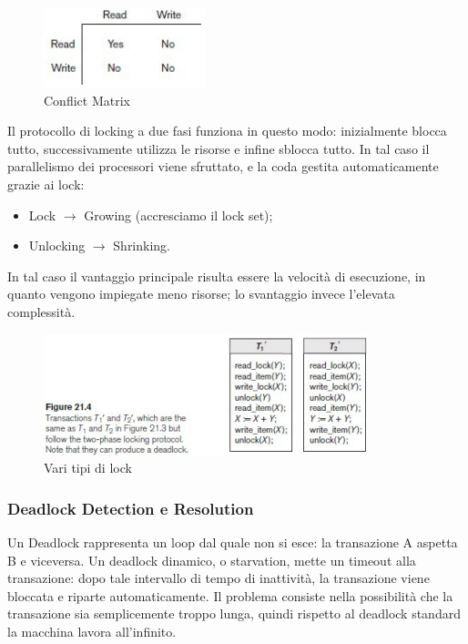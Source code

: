 \begin{center}
\begin{figure}[H]
\centering
\includegraphics[scale=1]{figures/conflict_matrix.png}
\caption{Conflict Matrix}
\end{figure}
\end{center}

Il protocollo di locking a due fasi funziona in questo modo: inizialmente blocca tutto, successivamente utilizza le risorse e infine sblocca tutto. In tal caso il parallelismo dei processori viene sfruttato, e la coda gestita automaticamente grazie ai lock:

\begin{itemize}

\item Lock $\rightarrow$ Growing (accresciamo il lock set);
\item Unlocking $\rightarrow$ Shrinking.

\end{itemize}

In tal caso il vantaggio principale risulta essere la velocità di esecuzione, in quanto vengono impiegate meno risorse; lo svantaggio invece l’elevata complessità.   

\begin{center}
\begin{figure}[H]
\centering
\includegraphics[scale=1]{figures/lock_modes.png}
\caption{Vari tipi di lock}
\end{figure}
\end{center}


\subsubsection{Deadlock Detection e Resolution}

Un Deadlock rappresenta un loop dal quale non si esce: la transazione A aspetta B e viceversa. Un deadlock dinamico, o starvation, mette un timeout alla transazione: dopo tale intervallo di tempo di inattività, la transazione viene bloccata e riparte automaticamente. Il problema consiste nella possibilità che la transazione sia 
semplicemente troppo lunga, quindi rispetto al deadlock standard la macchina lavora all’infinito.

